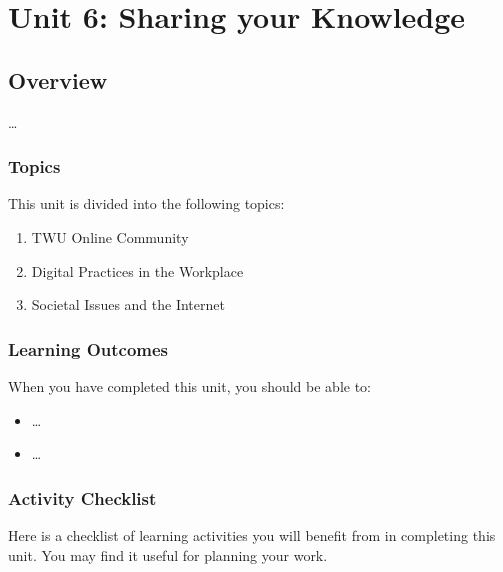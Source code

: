 \documentclass[
]{book}
\providecommand{\tightlist}{%
  \setlength{\itemsep}{0pt}\setlength{\parskip}{0pt}}
\theoremstyle{definition}
\theoremstyle{definition}
\theoremstyle{definition}
\theoremstyle{definition}
\theoremstyle{remark}
\begin{document}
\hypertarget{unit-6-sharing-your-knowledge}{%
\chapter{Unit 6: Sharing your Knowledge}\label{unit-6-sharing-your-knowledge}}

\hypertarget{overview-5}{%
\section*{Overview}\label{overview-5}}

\ldots{}

\hypertarget{topics-5}{%
\subsection*{Topics}\label{topics-5}}

This unit is divided into the following topics:

\begin{enumerate}
\def\labelenumi{\arabic{enumi}.}
\tightlist
\item
  TWU Online Community
\item
  Digital Practices in the Workplace
\item
  Societal Issues and the Internet
\end{enumerate}

\hypertarget{learning-outcomes-5}{%
\subsection*{Learning Outcomes}\label{learning-outcomes-5}}

When you have completed this unit, you should be able to:

\begin{itemize}
\tightlist
\item
  \ldots{}
\item
  \ldots{}
\end{itemize}

\hypertarget{activity-checklist-5}{%
\subsection*{Activity Checklist}\label{activity-checklist-5}}

Here is a checklist of learning activities you will benefit from in completing this unit. You may find it useful for planning your work.
\end{document}

